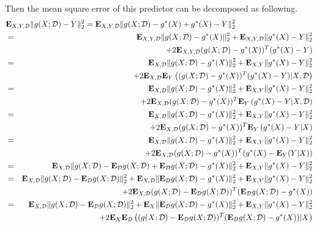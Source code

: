 Then the mean square error of this predictor can be decomposed as following.
\begin{eqnarray*}
\lefteqn{
\Expect_{X,Y,\dataset} \|g(X;\dataset) - Y\|_2^2
= \Expect_{X,Y,\dataset} \|g(X;\dataset) -g^\ast(X) + g^\ast(X)- Y\|_2^2
}
\\
&=&
	\Expect_{X,Y,\dataset} \|g(X;\dataset) -g^\ast(X) \|_2^2
	+ \Expect_{X,Y,\dataset} \|g^\ast(X)- Y\|_2^2
\\
&&
	+ 2 \Expect_{X,Y,\dataset} (g(X;\dataset) -g^\ast(X) )^T( g^\ast(X)- Y)
\\
&=&
	\Expect_{X,\dataset} \|g(X;\dataset) -g^\ast(X) \|_2^2
	+ \Expect_{X,Y} \|g^\ast(X)- Y\|_2^2
\\
&&
	+ 2 \Expect_{X,\dataset}  \Expect_Y \left( (g(X;\dataset) -g^\ast(X) )^T( g^\ast(X)- Y) |X,\dataset \right)
\\
&=&
	\Expect_{X,\dataset} \|g(X;\dataset) -g^\ast(X) \|_2^2
	+ \Expect_{X,Y} \|g^\ast(X)- Y\|_2^2
\\
&&
	+ 2 \Expect_{X,\dataset}  (g(X;\dataset) -g^\ast(X) )^T\Expect_Y \left( g^\ast(X)- Y |X,\dataset \right)
\\
&=&
	\Expect_{X,\dataset} \|g(X;\dataset) -g^\ast(X) \|_2^2
	+ \Expect_{X,Y} \|g^\ast(X)- Y\|_2^2
\\
&&
	+ 2 \Expect_{X,\dataset}  (g(X;\dataset) -g^\ast(X) )^T\Expect_Y \left( g^\ast(X)- Y |X \right)
\\
&=&
	\Expect_{X,\dataset} \|g(X;\dataset) -g^\ast(X) \|_2^2
	+ \Expect_{X,Y} \|g^\ast(X)- Y\|_2^2
\\
&&
	+ 2 \Expect_{X,\dataset}  (g(X;\dataset) -g^\ast(X) )^T( g^\ast(X)- \Expect_Y(Y|X))
\\
&=&
	\Expect_{X,\dataset} \|g(X;\dataset) - \Expect_\dataset g(X; \dataset) + \Expect_\dataset g(X; \dataset) -g^\ast(X) \|_2^2
	+ \Expect_{X,Y} \|g^\ast(X)- Y\|_2^2
\\
&=&
	\Expect_{X,\dataset} \|g(X;\dataset) - \Expect_\dataset g(X; \dataset)\|_2^2
	+ \Expect_{X,\dataset} \| \Expect_\dataset g(X; \dataset) -g^\ast(X) \|_2^2
	+ \Expect_{X,Y} \|g^\ast(X)- Y\|_2^2
\\
&&
	+ 2\Expect_{X,\dataset} (g(X;\dataset) - \Expect_\dataset g(X; \dataset))^T (\Expect_\dataset g(X; \dataset) -g^\ast(X) )
\\
&=&
	\Expect_{X,\dataset} \|g(X;\dataset) - \Expect_\dataset g(X; \dataset)\|_2^2
	+ \Expect_{X} \| \Expect_\dataset g(X; \dataset) -g^\ast(X) \|_2^2
	+ \Expect_{X,Y} \|g^\ast(X)- Y\|_2^2
\\
&&
	+ 2\Expect_{X} \Expect_\dataset \left( (g(X;\dataset) - \Expect_\dataset g(X; \dataset))^T (\Expect_\dataset g(X; \dataset) -g^\ast(X) ) |X\right)

\end{eqnarray*}
